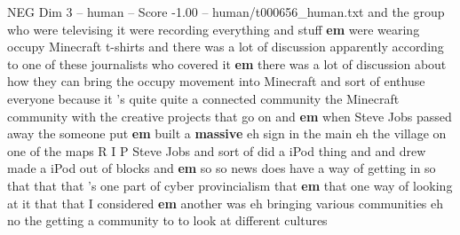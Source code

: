 \begin{textsample}{NEG Dim 3 – human – Score -1.00 – human/t000656\_human.txt}  \label{ex:f3_neg_034}
and the group who were televising it were recording everything and stuff \textbf{em} were wearing occupy Minecraft t-shirts and there was a lot of discussion apparently according to one of these journalists who covered it \textbf{em} there was a lot of discussion about how they can bring the occupy movement into Minecraft and sort of enthuse everyone because it 's quite quite a connected community the Minecraft community with the creative projects that go on and \textbf{em} when Steve Jobs passed away the someone put \textbf{em} built a \textbf{massive} eh sign in the main eh the village on one of the maps R I P Steve Jobs and sort of did a iPod thing and and drew made a iPod out of blocks and \textbf{em} so so news does have a way of getting in so that that that 's one part of cyber provincialism that \textbf{em} that one way of looking at it that that I considered \textbf{em} another was eh bringing various communities eh no the getting a community to to look at different cultures

\end{textsample}

